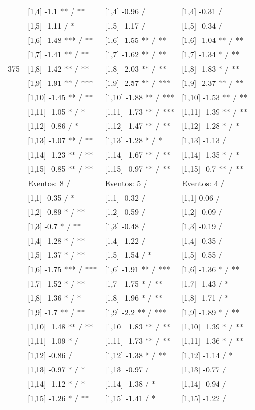 \begin{table}
\begin{tabular}[t]{llll}
\addlinespace
 & {}[1,4] -1.1 ** / ** & {}[1,4] -0.96  / & {}[1,4] -0.31  /\\
 & {}[1,5] -1.11  / * & {}[1,5] -1.17  / & {}[1,5] -0.34  /\\
 & {}[1,6] -1.48 *** / ** & {}[1,6] -1.55 ** / ** & {}[1,6] -1.04 ** / **\\
 & {}[1,7] -1.41 ** / ** & {}[1,7] -1.62 ** / ** & {}[1,7] -1.34 * / **\\
375 & {}[1,8] -1.42 ** / ** & {}[1,8] -2.03 ** / ** & {}[1,8] -1.83 * / **\\
\addlinespace
 & {}[1,9] -1.91 ** / *** & {}[1,9] -2.57 ** / *** & {}[1,9] -2.37 ** / **\\
 & {}[1,10] -1.45 ** / ** & {}[1,10] -1.88 ** / *** & {}[1,10] -1.53 ** / **\\
 & {}[1,11] -1.05 * / * & {}[1,11] -1.73 ** / *** & {}[1,11] -1.39 ** / **\\
 & {}[1,12] -0.86  / * & {}[1,12] -1.47 ** / ** & {}[1,12] -1.28 * / *\\
 & {}[1,13] -1.07 ** / ** & {}[1,13] -1.28 * / * & {}[1,13] -1.13  /\\
\addlinespace
 & {}[1,14] -1.23 ** / ** & {}[1,14] -1.67 ** / ** & {}[1,14] -1.35 * / *\\
 & {}[1,15] -0.85 ** / ** & {}[1,15] -0.97 ** / ** & {}[1,15] -0.7 ** / **\\
 & Eventos:  8 / & Eventos:  5 / & Eventos:  4 /\\
 & {}[1,1] -0.35  / * & {}[1,1] -0.32  / & {}[1,1] 0.06  /\\
 & {}[1,2] -0.89 * / ** & {}[1,2] -0.59  / & {}[1,2] -0.09  /\\
\addlinespace
 & {}[1,3] -0.7 * / ** & {}[1,3] -0.48  / & {}[1,3] -0.19  /\\
 & {}[1,4] -1.28 * / ** & {}[1,4] -1.22  / & {}[1,4] -0.35  /\\
 & {}[1,5] -1.37 * / ** & {}[1,5] -1.54  / * & {}[1,5] -0.55  /\\
 & {}[1,6] -1.75 *** / *** & {}[1,6] -1.91 ** / *** & {}[1,6] -1.36 * / **\\
 & {}[1,7] -1.52 * / ** & {}[1,7] -1.75 * / ** & {}[1,7] -1.43  / *\\
\addlinespace
500 & {}[1,8] -1.36 * / * & {}[1,8] -1.96 * / ** & {}[1,8] -1.71  / *\\
 & {}[1,9] -1.7 ** / ** & {}[1,9] -2.2 ** / *** & {}[1,9] -1.89 * / **\\
 & {}[1,10] -1.48 ** / ** & {}[1,10] -1.83 ** / ** & {}[1,10] -1.39 * / **\\
 & {}[1,11] -1.09 * / & {}[1,11] -1.73 ** / ** & {}[1,11] -1.36 * / **\\
 & {}[1,12] -0.86  / & {}[1,12] -1.38 * / ** & {}[1,12] -1.14  / *\\
\addlinespace
 & {}[1,13] -0.97 * / * & {}[1,13] -0.97  / & {}[1,13] -0.77  /\\
 & {}[1,14] -1.12 * / * & {}[1,14] -1.38  / * & {}[1,14] -0.94  /\\
 & {}[1,15] -1.26 * / ** & {}[1,15] -1.41  / * & {}[1,15] -1.22  /\\
\bottomrule
\end{tabular}
\end{table}
